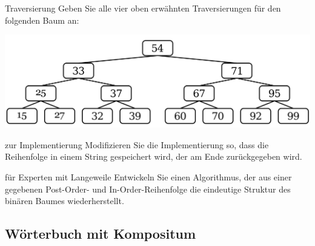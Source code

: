 \documentclass{article}
\begin{document}
\begin{task}{Traversierung}
Geben Sie alle vier oben erwähnten Traversierungen für den folgenden Baum an:
\begin{center}
    \includegraphics[scale=0.2]{../media/traversal_task.png}
\end{center}
\end{task}
\begin{task}{zur Implementierung}
Modifizieren Sie die Implementierung so, dass die Reihenfolge in einem String gespeichert wird, der am Ende zurückgegeben wird. 
\end{task}
\begin{task}{für Experten mit Langeweile}
Entwickeln Sie einen Algorithmus, der aus einer gegebenen Post-Order- und In-Order-Reihenfolge die eindeutige Struktur des binären Baumes wiederherstellt. 
\end{task}

\newpage 
\subsection{Wörterbuch mit Kompositum}
\end{document}
